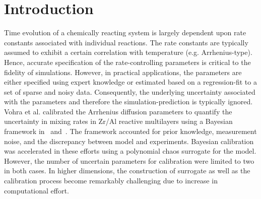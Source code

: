 \section{Introduction}
\label{sec:intro}



Time evolution of a chemically reacting system is largely dependent upon rate constants
associated with individual reactions. The rate constants are typically assumed to exhibit
a certain correlation with temperature (e.g. Arrhenius-type). Hence, accurate specification
of the rate-controlling parameters is critical to the fidelity of simulations. However,
in practical applications, the parameters are either specified using expert knowledge or
estimated based on a regression-fit to a set of sparse and noisy data. Consequently, the
underlying uncertainty associated with the parameters and therefore the simulation-prediction
is typically ignored. Vohra et al. calibrated the Arrhenius diffusion parameters to quantify
the uncertainty in mixing rates in Zr/Al reactive multilayers using a Bayesian framework
in~\cite{Vohra:2014} and~\cite{Vohra:2017}. The framework accounted for prior knowledge,
measurement noise, and the discrepancy between model and experiments. Bayesian calibration
was accelerated in these efforts using a polynomial chaos surrogate for the model. However,
the number of uncertain parameters for calibration were limited to two in both cases. In
higher dimensions, the construction of surrogate as well as the calibration process become
remarkably challenging due to increase in computational effort.      

